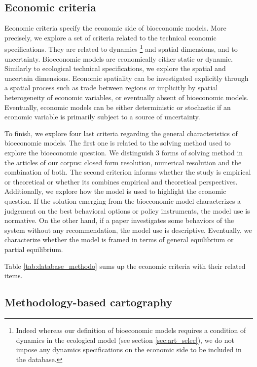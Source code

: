 \subsection{Economic criteria}

Economic criteria specify the economic side of bioeconomic models. More precisely, we explore a set of criteria related to the technical economic specifications. They are related to dynamics \footnote{Indeed whereas our definition of bioeconomic models requires a condition of dynamics in the ecological model (see section \ref{sec:art_selec}), we do not impose any dynamics specifications on the economic side to be included in the database.} and spatial dimensions, and to uncertainty. 
Bioeconomic models are economically either static or dynamic. Similarly to ecological technical specifications, we explore the spatial and uncertain dimensions. Economic spatiality can be investigated explicitly through a spatial process such as trade between regions or implicitly by spatial heterogeneity of economic variables, or eventually absent of  bioeconomic models. Eventually, economic models can be either deterministic or stochastic if an economic variable is primarily subject to a source of uncertainty. 

To finish, we explore four last criteria regarding the general characteristics of bioeconomic models. The first one is related to the solving method used to explore the bioeconomic question.
We distinguish 3 forms of solving method in the articles of our corpus: closed form resolution, numerical resolution and the combination of both. The second criterion informs whether the study is empirical or theoretical or whether its combines empirical and theoretical perspectives. 
Additionally, we explore how the model is used to highlight the economic question. If the solution emerging from the bioeconomic model characterizes a judgement on the best behavioral options or policy instruments, the model use is normative. On the other hand, if a paper investigates some behaviors of the system without any recommendation, the model use is descriptive.
Eventually, we characterize whether the model is framed in terms of general equilibrium or partial equilibrium. 

Table \ref{tab:database_methodo} sums up the economic criteria with their related items.

\subsection{Methodology-based cartography}

